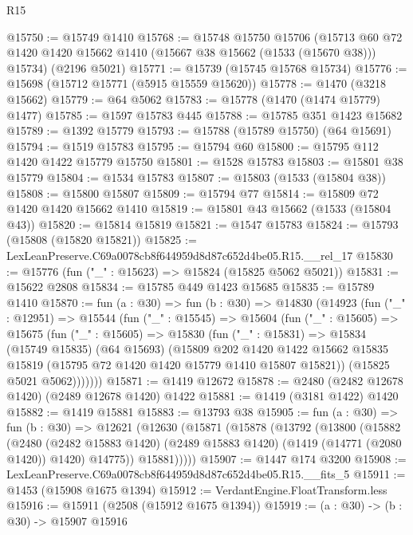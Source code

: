 \begin{lexlean}{R15}
\begin{coremodule}
@15750 := @15749 @1410
@15768 := @15748
    @15750
    @15706
    (@15713 @60 @72 @1420 @1420 @15662 @1410 (@15667 @38 @15662 (@1533 (@15670 @38))) @15734)
    (@2196 @5021)
@15771 := @15739 (@15745 @15768 @15734)
@15776 := @15698 (@15712 @15771 (@5915 @15559 @15620))
@15778 := @1470 (@3218 @15662)
@15779 := @64 @5062
@15783 := @15778 (@1470 (@1474 @15779) @1477)
@15785 := @1597 @15783 @445
@15788 := @15785 @351 @1423 @15682
@15789 := @1392 @15779
@15793 := @15788 (@15789 @15750) (@64 @15691)
@15794 := @1519 @15783
@15795 := @15794 @60
@15800 := @15795 @112 @1420 @1422 @15779 @15750
@15801 := @1528 @15783
@15803 := @15801 @38 @15779
@15804 := @1534 @15783
@15807 := @15803 (@1533 (@15804 @38))
@15808 := @15800 @15807
@15809 := @15794 @77
@15814 := @15809 @72 @1420 @1420 @15662 @1410
@15819 := @15801 @43 @15662 (@1533 (@15804 @43))
@15820 := @15814 @15819
@15821 := @1547 @15783
@15824 := @15793 (@15808 (@15820 @15821))
@15825 := LexLeanPreserve.C69a0078cb8f644959d8d87c652d4be05.R15.__rel_17
@15830 := @15776 (fun ("_" : @15623) => @15824 (@15825 @5062 @5021))
@15831 := @15622 @2808
@15834 := @15785 @449 @1423 @15685
@15835 := @15789 @1410
@15870 := fun (a : @30) =>
  fun (b : @30) =>
  @14830
    (@14923
      (fun ("_" : @12951) =>
      @15544
        (fun ("_" : @15545) =>
        @15604
          (fun ("_" : @15605) =>
          @15675
            (fun ("_" : @15605) =>
            @15830
              (fun ("_" : @15831) =>
              @15834
                (@15749 @15835)
                (@64 @15693)
                (@15809
                  @202
                  @1420
                  @1422
                  @15662
                  @15835
                  @15819
                  (@15795 @72 @1420 @1420 @15779 @1410 @15807 @15821))
                (@15825 @5021 @5062)))))))
@15871 := @1419 @12672
@15878 := @2480 (@2482 @12678 @1420) (@2489 @12678 @1420) @1422
@15881 := @1419 (@3181 @1422) @1420
@15882 := @1419 @15881
@15883 := @13793 @38
@15905 := fun (a : @30) =>
  fun (b : @30) =>
  @12621
    (@12630
      (@15871
        (@15878
          (@13792
            (@13800
              (@15882
                (@2480
                  (@2482 @15883 @1420)
                  (@2489 @15883 @1420)
                  (@1419 (@14771 (@2080 @1420)) @1420)
                  @14775))
              @15881)))))
@15907 := @1447 @174 @3200
@15908 := LexLeanPreserve.C69a0078cb8f644959d8d87c652d4be05.R15.__fits_5
@15911 := @1453 (@15908 @1675 @1394)
@15912 := VerdantEngine.FloatTransform.less
@15916 := @15911 (@2508 (@15912 @1675 @1394))
@15919 := (a : @30) -> (b : @30) -> @15907 @15916

\end{coremodule}
\end{lexlean}
